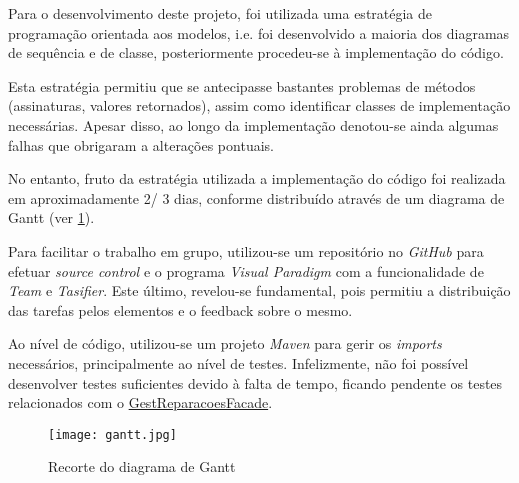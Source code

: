 \documentclass[relatorio.tex]{subfiles}
\begin{document}
Para o desenvolvimento deste projeto, foi utilizada uma estratégia de programação
orientada aos modelos, i.e. foi desenvolvido a maioria dos diagramas de sequência
e de classe, posteriormente procedeu-se à implementação do código.

Esta estratégia permitiu que se antecipasse bastantes problemas de métodos
(assinaturas, valores retornados), assim como identificar classes de implementação necessárias.
Apesar disso, ao longo da implementação denotou-se ainda algumas falhas que obrigaram a alterações pontuais.

No entanto, fruto da estratégia utilizada a implementação do código foi realizada em aproximadamente
2/ 3 dias, conforme distribuído através de um diagrama de Gantt (ver \ref{img:diagrama_gantt}).

Para facilitar o trabalho em grupo, utilizou-se um repositório no \textit{GitHub} para efetuar
\textit{source control} e o programa \textit{Visual Paradigm} com a funcionalidade de \textit{Team} e
\textit{Tasifier}.
Este último, revelou-se fundamental, pois permitiu a distribuição das tarefas pelos elementos
e o feedback sobre o mesmo.

Ao nível de código, utilizou-se um projeto \textit{Maven} para gerir os \textit{imports} necessários,
principalmente ao nível de testes. Infelizmente, não foi possível desenvolver testes suficientes
devido à falta de tempo, ficando pendente os testes relacionados com o \underline{GestReparacoesFacade}.

\begin{landscape}
    \begin{figure} [!ht]
        \centering
        \texttt{[image: gantt.jpg]}
        \caption{Recorte do diagrama de Gantt} \label{img:diagrama_gantt}
    \end{figure}
\end{landscape}
\end{document}
